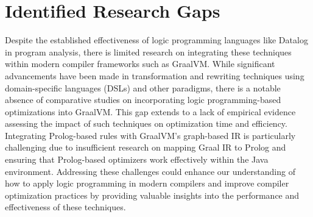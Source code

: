 \section{Identified Research Gaps}
Despite the established effectiveness of logic programming languages like Datalog in program analysis, there is limited research on integrating these techniques within modern compiler frameworks such as GraalVM. While significant advancements have been made in transformation and rewriting techniques using domain-specific languages (DSLs) and other paradigms, there is a notable absence of comparative studies on incorporating logic programming-based optimizations into GraalVM. This gap extends to a lack of empirical evidence assessing the impact of such techniques on optimization time and efficiency. Integrating Prolog-based rules with GraalVM’s graph-based IR is particularly challenging due to insufficient research on mapping Graal IR to Prolog and ensuring that Prolog-based optimizers work effectively within the Java environment. Addressing these challenges could enhance our understanding of how to apply logic programming in modern compilers and improve compiler optimization practices by providing valuable insights into the performance and effectiveness of these techniques.
